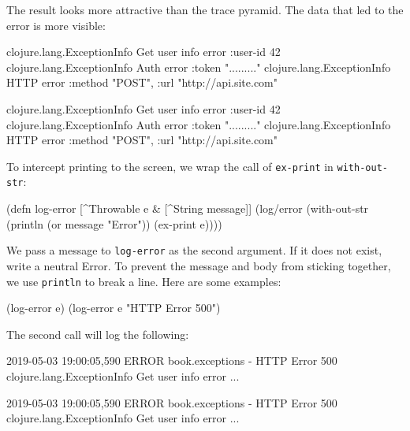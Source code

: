 \fi

The result looks more attractive than the trace pyramid. The data that led to the error is more visible:

\ifx\DEVICETYPE\MOBILE

\begin{clojure}
clojure.lang.ExceptionInfo
  Get user info error
  {:user-id 42}
clojure.lang.ExceptionInfo
  Auth error
  {:token "........."}
clojure.lang.ExceptionInfo
  HTTP error
  {:method "POST",
   :url "http://api.site.com"}
\end{clojure}

\else

\begin{clojure}
clojure.lang.ExceptionInfo
  Get user info error
  {:user-id 42}
clojure.lang.ExceptionInfo
  Auth error
  {:token "........."}
clojure.lang.ExceptionInfo
  HTTP error
  {:method "POST", :url "http://api.site.com"}
\end{clojure}

\fi


To intercept printing to the screen, we wrap the call of \verb|ex-print| in \verb|with-out-str|:

\begin{clojure}
(defn log-error
  [^Throwable e & [^String message]]
  (log/error
   (with-out-str
     (println (or message "Error"))
     (ex-print e))))
\end{clojure}

We pass a message to \verb|log-error| as the second argument. If it does not exist, write a neutral Error. To prevent the message and body from sticking together, we use \verb|println| to break a line. Here are some examples:

\begin{clojure}
(log-error e)
(log-error e "HTTP Error 500")
\end{clojure}

The second call will log the following:

\ifx\DEVICETYPE\MOBILE

\begin{text}
2019-05-03 19:00:05,590 ERROR
book.exceptions - HTTP Error 500
clojure.lang.ExceptionInfo
  Get user info error
  ...
\end{text}

\else

\begin{text}
2019-05-03 19:00:05,590 ERROR book.exceptions - HTTP Error 500
clojure.lang.ExceptionInfo
  Get user info error
  ...
\end{text}

